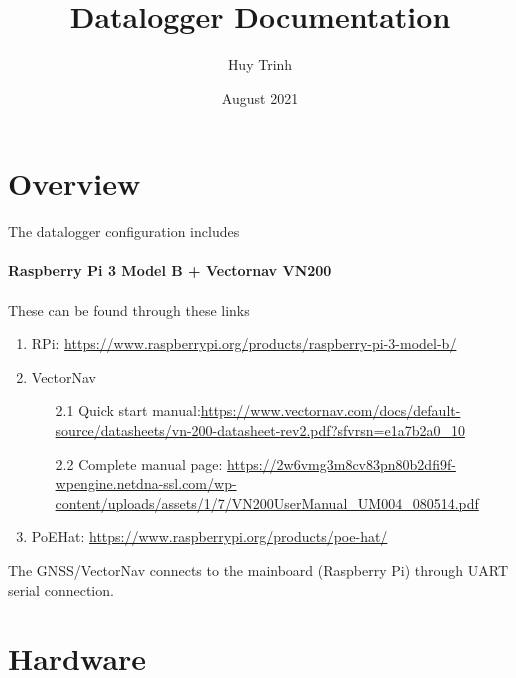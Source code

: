 \documentclass{report}
\title{Datalogger Documentation}
\author{Huy Trinh }
\date{August 2021}
\begin{document}
\begin{titlepage}
\maketitle
\end{titlepage}



\section{Overview}

The datalogger configuration includes\\
\\\textbf{Raspberry Pi 3 Model B + Vectornav VN200}
\\
\\These can be found through these links
\begin{enumerate}
    \item RPi: \url{https://www.raspberrypi.org/products/raspberry-pi-3-model-b/}
    \item VectorNav
    \begin{enumerate}
        \item[2.1] Quick start manual:\url{https://www.vectornav.com/docs/default-source/datasheets/vn-200-datasheet-rev2.pdf?sfvrsn=e1a7b2a0_10}
        \item[2.2] Complete manual page: \url{https://2w6vmg3m8cv83pn80b2dfi9f-wpengine.netdna-ssl.com/wp-content/uploads/assets/1/7/VN200UserManual_UM004_080514.pdf}
    \end{enumerate}
    \item PoEHat: \url{https://www.raspberrypi.org/products/poe-hat/}
\end{enumerate}
The GNSS/VectorNav connects to the mainboard (Raspberry Pi) through UART serial connection.

\section{Hardware}
\end{document}
